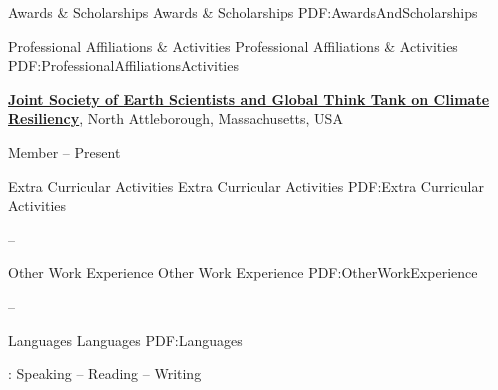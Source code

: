 \documentclass[letterpaper,MMMyyyy,nonstopmode]{simpleresumecv}
\begin{document}
\begin{Body}

\Section
{Awards \&\newline
Scholarships}
{Awards \& Scholarships}
{PDF:AwardsAndScholarships}

\Gap
\BulletItem
{}



\Section
{Professional Affiliations\newline
\& Activities}
{Professional Affiliations \& Activities}
{PDF:ProfessionalAffiliationsActivities}

\Entry
\href{http://www.example.com/my-society}
{\textbf{Joint Society of Earth Scientists and Global Think Tank on Climate Resiliency}},
\newline
North Attleborough, Massachusetts, USA

\Gap
\BulletItem
Member
\hfill
{} --
Present



\Section
{Extra Curricular Activities}
{Extra Curricular Activities}
{PDF:Extra Curricular Activities}

\Entry
{}
\Gap
\BulletItem
{\textbf{}}
\hfill
\DatestampYMD{} --
\DatestampYMD{}
\begin{Detail}
\end{Detail}



\Section
{Other Work\newline
Experience}
{Other Work Experience}
{PDF:OtherWorkExperience}

\Entry
{}
{\textbf{}}
\Gap
\BulletItem
{}
\hfill
{} --
\begin{Detail}
\end{Detail}


\Section
{Languages}
{Languages}
{PDF:Languages}

\Gap
\BulletItem
{} :
Speaking --
Reading --
Writing



\end{Body}
\end{document}
